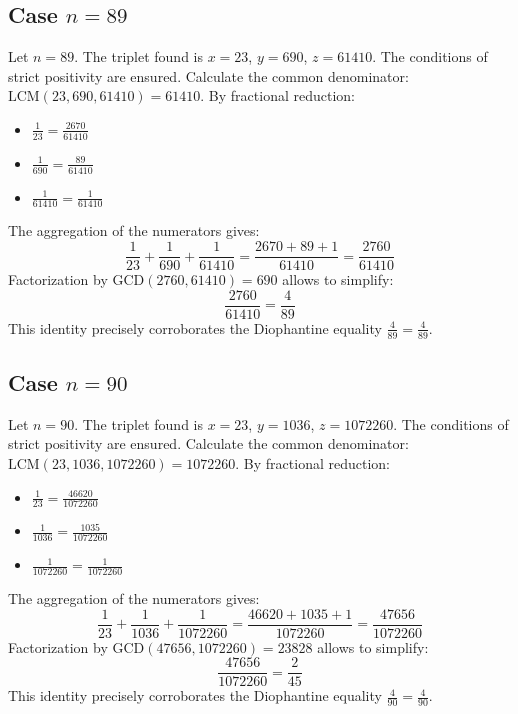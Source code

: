 \documentclass[11pt,a4paper]{article}
\begin{document}
\subsection{Case $n = 89$}
Let $n = 89$. The triplet found is $x = 23$, $y = 690$, $z = 61410$.
The conditions of strict positivity are ensured.
Calculate the common denominator: $\text{LCM}(23, 690, 61410) = 61410$.
By fractional reduction:
\begin{itemize}
    \item $\frac{1}{23} = \frac{2670}{61410}$
    \item $\frac{1}{690} = \frac{89}{61410}$
    \item $\frac{1}{61410} = \frac{1}{61410}$
\end{itemize}
The aggregation of the numerators gives:
$$ \frac{1}{23} + \frac{1}{690} + \frac{1}{61410} = \frac{2670 + 89 + 1}{61410} = \frac{2760}{61410} $$
Factorization by $\text{GCD}(2760, 61410) = 690$ allows to simplify:
$$ \frac{2760}{61410} = \frac{4}{89} $$
This identity precisely corroborates the Diophantine equality $\frac{4}{89} = \frac{4}{89}$.

\subsection{Case $n = 90$}
Let $n = 90$. The triplet found is $x = 23$, $y = 1036$, $z = 1072260$.
The conditions of strict positivity are ensured.
Calculate the common denominator: $\text{LCM}(23, 1036, 1072260) = 1072260$.
By fractional reduction:
\begin{itemize}
    \item $\frac{1}{23} = \frac{46620}{1072260}$
    \item $\frac{1}{1036} = \frac{1035}{1072260}$
    \item $\frac{1}{1072260} = \frac{1}{1072260}$
\end{itemize}
The aggregation of the numerators gives:
$$ \frac{1}{23} + \frac{1}{1036} + \frac{1}{1072260} = \frac{46620 + 1035 + 1}{1072260} = \frac{47656}{1072260} $$
Factorization by $\text{GCD}(47656, 1072260) = 23828$ allows to simplify:
$$ \frac{47656}{1072260} = \frac{2}{45} $$
This identity precisely corroborates the Diophantine equality $\frac{4}{90} = \frac{4}{90}$.
\end{document}
